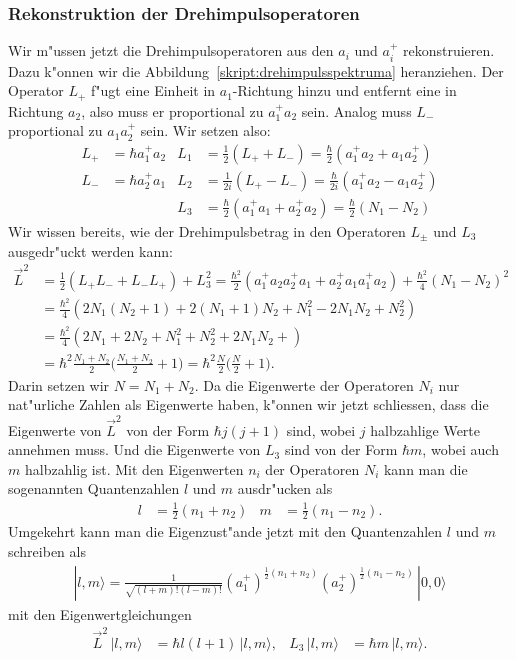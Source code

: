 \subsubsection{Rekonstruktion der Drehimpulsoperatoren}
Wir m"ussen jetzt die Drehimpulsoperatoren aus den $a_i$ und $a_i^+$
rekonstruieren.
Dazu k"onnen wir die Abbildung~\ref{skript:drehimpulsspektruma} heranziehen.
Der Operator $L_+$ f"ugt eine Einheit in $a_1$-Richtung hinzu und
entfernt eine in Richtung $a_2$, also muss er proportional zu
$a_1^+a_2$ sein.
Analog muss $L_-$ proportional zu $a_1a_2^+$ sein. Wir setzen also:
\begin{align*}
L_+
&=
\hbar a_1^+a_2
&
L_1
&=
\frac12(L_++L_-)
=
\frac{\hbar}2(a_1^+a_2+a_1a_2^+)
\\
L_-
&=
\hbar a_2^+a_1
&
L_2
&=
\frac1{2i}(L_+-L_-)
=
\frac{\hbar}{2i}(a_1^+a_2-a_1a_2^+)
\\
&&
L_3
&=
\frac{\hbar}2(a_1^+a_1+a_2^+a_2)
=
\frac{\hbar}2(N_1-N_2)
\end{align*}
Wir wissen bereits, wie der Drehimpulsbetrag in den Operatoren 
$L_\pm$ und $L_3$ ausgedr"uckt werden kann:
\begin{align*}
\vec L^2
&=
\frac12(L_+L_-+L_-L_+)+L_3^2
=
\frac{\hbar^2}2(a_1^+a_2a_2^+a_1+a_2^+a_1a_1^+a_2)+\frac{\hbar^2}{4}(N_1-N_2)^2
\\
&=
\frac{\hbar^2}4(
2N_1(N_2+1)+2(N_1+1)N_2
+N_1^2-2N_1N_2+N_2^2
)
\\
&=
\frac{\hbar^2}{4}(
2N_1+2N_2
+
N_1^2+N_2^2
+2N_1N_2
+
)
\\
&=
\hbar^2\frac{N_1+N_2}2\biggl(\frac{N_1+N_2}2+1\biggr)
=
\hbar^2\frac{N}2\biggl(\frac{N}2+1\biggr).
\end{align*}
Darin setzen wir $N=N_1+N_2$. Da die Eigenwerte der Operatoren $N_i$
nur nat"urliche Zahlen als Eigenwerte haben, k"onnen wir jetzt schliessen,
dass die Eigenwerte von $\vec L^2$ von der Form $\hbar j(j+1)$ sind,
wobei $j$ halbzahlige Werte annehmen muss.
Und die Eigenwerte von $L_3$ sind von der Form $\hbar m$, wobei auch
$m$ halbzahlig ist.
Mit den Eigenwerten $n_i$ der Operatoren $N_i$ kann man die sogenannten
Quantenzahlen $l$ und $m$ ausdr"ucken als
\begin{align*}
l
&=
\frac12(n_1+n_2)
&
m
&=
\frac12(n_1-n_2).
\end{align*}
Umgekehrt kann man die Eigenzust"ande jetzt mit den Quantenzahlen $l$ und $m$
schreiben als
\begin{align*}
|l,m\rangle
=
\frac1{\sqrt{(l+m)!(l-m)!}}
(a_1^+)^{\frac12(n_1+n_2)}
(a_2^+)^{\frac12(n_1-n_2)}
\,|0,0\rangle
\end{align*}
mit den Eigenwertgleichungen
\begin{align*}
\vec L^2\,|l,m\rangle&=\hbar l(l+1)\,|l,m\rangle,
&
L_3\,|l,m\rangle&=\hbar m\,|l,m\rangle.
\end{align*}

